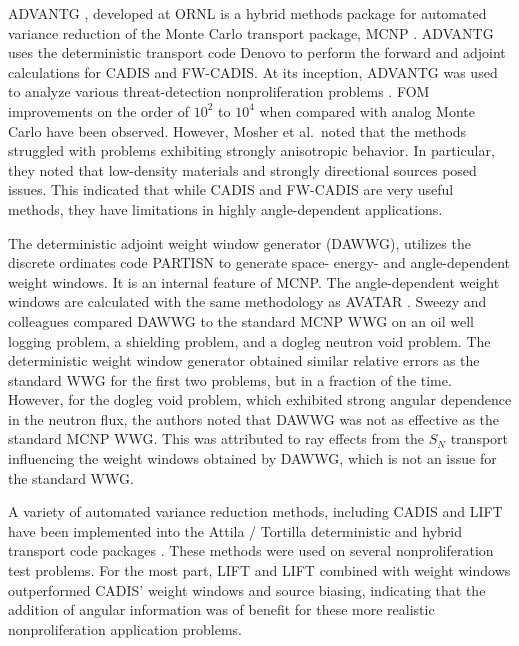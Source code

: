 ADVANTG \cite{mosher_automated_2009},
developed at ORNL \cite{mosher_new_2010,
wagner_review_2011, bevill_new_2012} is a hybrid methods package
for automated variance reduction of
the Monte Carlo transport package, MCNP \cite{mcnp_manual_v2}.
ADVANTG uses the deterministic
transport code Denovo \cite{evans_denovo:_2010} to perform the forward and
adjoint calculations for CADIS and FW-CADIS. At its inception, ADVANTG was used
to analyze various threat-detection nonproliferation problems
\cite{mosher_automated_2009}. FOM improvements on the order of $10^2$
to $10^4$ when compared with analog Monte Carlo have been observed.
However, Mosher et al.\ noted
that the methods struggled with problems exhibiting strongly anisotropic
behavior. In particular, they noted that low-density materials and strongly
directional sources posed issues. This indicated that while CADIS and FW-CADIS
are very useful methods, they have limitations in highly angle-dependent
applications.

The deterministic adjoint weight window generator
(DAWWG), utilizes the discrete ordinates code PARTISN
\cite{sweezy_automated_2005} to generate space- energy- and angle-dependent
weight windows. It is an internal feature of MCNP.
The angle-dependent weight windows are calculated with the same
methodology as AVATAR \cite{sweezy_automated_2005, van_riper_generation_1995}.
Sweezy and colleagues compared
DAWWG to the standard MCNP WWG on an oil well logging problem, a shielding
problem, and a dogleg neutron void problem. The deterministic weight window
generator obtained similar relative errors as the standard WWG for the first two problems,
but in a fraction of the time. However, for the dogleg void problem, which
exhibited strong angular dependence in the neutron flux,
the authors noted that DAWWG was not as effective as the
standard MCNP WWG. This was attributed to ray effects from the $S_N$ transport
influencing the weight windows obtained by DAWWG, which is not an issue for the
standard WWG.

A variety of automated variance reduction methods, including CADIS and LIFT have
been implemented into the Attila / Tortilla deterministic and hybrid transport
code packages \cite{somasundaram_implementation_2013}. These methods
were used on several
nonproliferation test problems. For the most part, LIFT and LIFT combined with
weight windows outperformed CADIS' weight windows and source biasing, indicating
that the addition of angular information was of benefit for these more realistic
nonproliferation application
problems.

